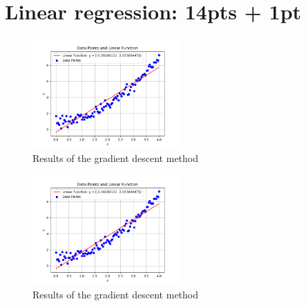 \documentclass[12pt]{article}
\begin{document}
\section{Linear regression: 14pts + 1pt}
    \begin{figure}[h]
    \centering
    \includegraphics[width=0.5\textwidth]{imgs/Figure_grad.png}
    \caption{Results of the gradient descent method}
    \end{figure}

    \begin{figure}[h]
        \centering
        \includegraphics[width=0.5\textwidth]{imgs/Figure_normal.png}
        \caption{Results of the gradient descent method}
        \end{figure}
\end{document}
